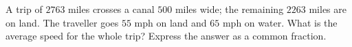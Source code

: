 A trip of $2763$ miles crosses a canal $500$ miles wide; the remaining $2263$ miles are on land. The traveller goes $55$ mph on land and $65$ mph on water. What is the average speed for the whole trip? Express the answer as a common fraction.
